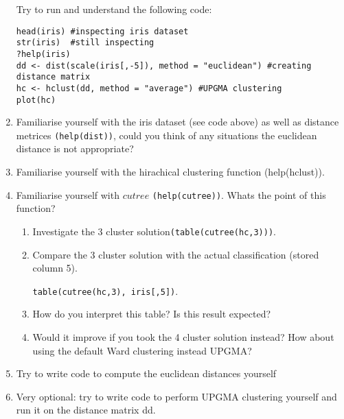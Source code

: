 \documentclass[11pt,runningheads,a4paper]{article}
\begin{document}
\begin{enumerate}
Try to run and understand the following code:


\lstset{language=S,style=customc}
\begin{lstlisting}
head(iris) #inspecting iris dataset
str(iris)  #still inspecting
?help(iris)
dd <- dist(scale(iris[,-5]), method = "euclidean") #creating distance matrix
hc <- hclust(dd, method = "average") #UPGMA clustering
plot(hc)
\end{lstlisting}

\item Familiarise yourself with the iris dataset (see code above) as well as distance metrices \lstinline{(help(dist))}, could you think of any situations the euclidean distance is not appropriate?
\item Familiarise yourself with the hirachical clustering function (help(hclust)).
\item Familiarise yourself with $cutree$ \lstinline{(help(cutree))}. Whats the point of this function?

\begin{enumerate}
  \item Investigate the 3 cluster solution\lstinline{(table(cutree(hc,3)))}.
\item Compare the 3 cluster solution with the actual classification (stored column 5).

  \lstinline{table(cutree(hc,3), iris[,5])}.
\item How do you interpret this table? Is this result expected?
\item Would it improve if you took the 4 cluster solution instead? How about using the default Ward clustering instead UPGMA?
\end{enumerate}

\item Try to write code to compute the euclidean distances yourself
\item Very optional: try to write code to perform UPGMA clustering yourself and run it on the distance matrix dd.
\end{enumerate}
\end{document}
